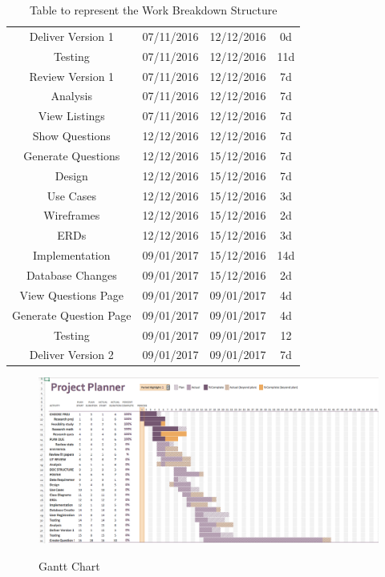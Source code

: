 \begin{table}[h!]
\begin{tabular}{||c c c c||}
Deliver Version 1 		& 07/11/2016 & 12/12/2016 & 0d \\
Testing 				& 07/11/2016 & 12/12/2016 & 11d \\
Review Version 1 		& 07/11/2016 & 12/12/2016 & 7d \\
Analysis 				& 07/11/2016 & 12/12/2016 & 7d \\
View Listings 			& 07/11/2016 & 12/12/2016 & 7d \\
Show Questions 		& 12/12/2016 & 12/12/2016 & 7d \\
Generate Questions 		& 12/12/2016 & 15/12/2016 & 7d \\
Design 				& 12/12/2016& 15/12/2016 & 7d \\
Use Cases 			& 12/12/2016 & 15/12/2016 & 3d \\
Wireframes 			& 12/12/2016 & 15/12/2016 & 2d \\
ERDs 				& 12/12/2016 & 15/12/2016 & 3d \\
Implementation 		& 09/01/2017 & 15/12/2016 & 14d \\
Database Changes 		& 09/01/2017 & 15/12/2016 & 2d \\
View Questions Page 	& 09/01/2017 & 09/01/2017 & 4d \\
Generate Question Page 	& 09/01/2017 & 09/01/2017 & 4d \\
Testing 				& 09/01/2017 & 09/01/2017 & 12 \\
Deliver Version 2 		& 09/01/2017 & 09/01/2017 & 7d \\
												
 \hline
\end{tabular}
\caption{Table to represent the Work Breakdown Structure}
\label{table:1}
\end{table}

\begin{figure}[htbp]
\center \includegraphics[width=400pt]{Figures/gantt}\\
\caption{Gantt Chart} \label{Figure: Gantt Chart}
\end{figure}
